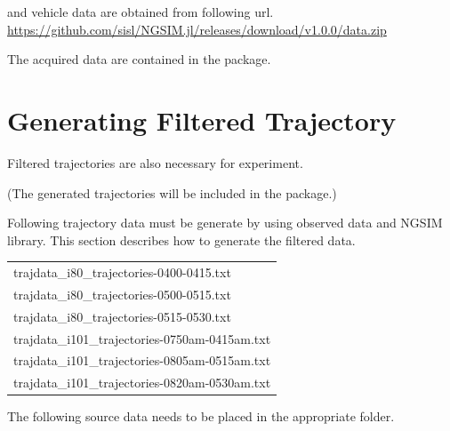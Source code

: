 \documentclass[openany,11pt]{report}%
\begin{document}
and vehicle data are obtained from following url.
\url{https://github.com/sisl/NGSIM.jl/releases/download/v1.0.0/data.zip}



The acquired data are contained in the package.


\section{Generating Filtered Trajectory}

Filtered trajectories are also necessary for experiment.

(The generated trajectories will be included in the package.)

Following trajectory data must be generate by using observed data and NGSIM library.
This section describes how to generate the filtered data. 

\begin{tabular}{l}
trajdata\_i80\_trajectories-0400-0415.txt \\
trajdata\_i80\_trajectories-0500-0515.txt \\
trajdata\_i80\_trajectories-0515-0530.txt \\
trajdata\_i101\_trajectories-0750am-0415am.txt \\
trajdata\_i101\_trajectories-0805am-0515am.txt \\
trajdata\_i101\_trajectories-0820am-0530am.txt \\
\end{tabular}

\vspace{5mm}

The following source data needs to be placed in the appropriate folder.
\end{document}
